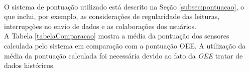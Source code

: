 \begin{center}
\label{tabelaOEE}
\end{center}

\\\null \quad O sistema de pontuação utilizado está descrito na Seção \ref{subsec:pontuacao}, o que inclui, por exemplo, as considerações de regularidade das leituras, interrupções no envio de dados e as colaborações dos usuários.
\\\null \quad A Tabela \ref{tabelaComparacao} mostra a média da pontuação dos sensores calculada pelo sistema em comparação com a pontuação \acrshort{OEE}. A utilização da média da pontuação calculada foi necessária devido ao fato da \textit{\acrlong{OEE}} tratar de dados históricos.

